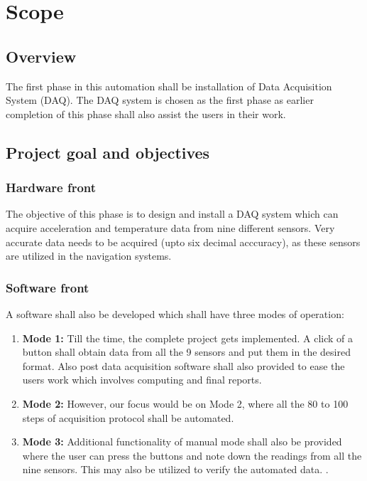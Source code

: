 \documentclass{FR16}
\begin{document}
\maketitle

\tableofcontents
\newpage

\section{Scope}

\subsection{Overview}
The first phase in this automation shall be installation of Data Acquisition System (DAQ). The DAQ system is chosen as the first phase as earlier completion of this phase shall also assist the users in their work. 

\subsection{Project goal and objectives}

\subsubsection{Hardware front}
The objective of this phase is to design and install a DAQ system which can  acquire acceleration and temperature data from nine different sensors. Very accurate data needs to be acquired (upto six decimal acccuracy), as these sensors are  utilized in the navigation systems. 

\subsubsection{Software front}
A software shall also be developed which shall have three modes of operation:
\begin{enumerate}
    \item \textbf{Mode 1:} Till the time, the complete project gets implemented. A click of a button shall obtain data from all the 9 sensors and put them in the desired format. Also post data acquisition software shall also provided to ease the users work which involves computing and final reports.
    \item \textbf{Mode 2:} However, our focus would be on Mode 2, where all the 80 to 100 steps of acquisition protocol shall be automated.
    \item \textbf{Mode 3:} Additional functionality of manual mode shall also be provided where the user can press the buttons and note down the readings from all the nine sensors. This may also be utilized to verify the automated data. .
\end{enumerate}
\end{document}
